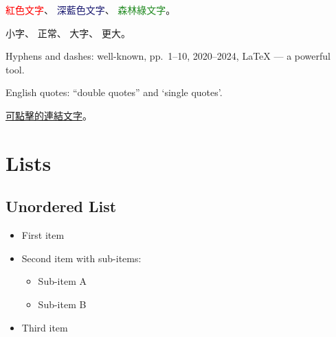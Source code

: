 \documentclass[a4paper,12pt]{article}
\begin{document}
\textcolor{red}{紅色文字}、
\textcolor{MidnightBlue}{深藍色文字}、
\textcolor{ForestGreen}{森林綠文字}。

{\footnotesize 小字}、
{\normalsize 正常}、
{\large 大字}、
{\Large 更大}。


Hyphens and dashes: well-known, pp.~1--10, 2020--2024, LaTeX --- a powerful tool.

English quotes: ``double quotes'' and `single quotes'.

\href{https://example.com}{可點擊的連結文字}。

\section{Lists}

\subsection{Unordered List}

\begin{itemize}
    \item First item
    \item Second item with sub-items:
    \begin{itemize}
        \item Sub-item A
        \item Sub-item B
    \end{itemize}
    \item Third item
\end{itemize}
\end{document}
